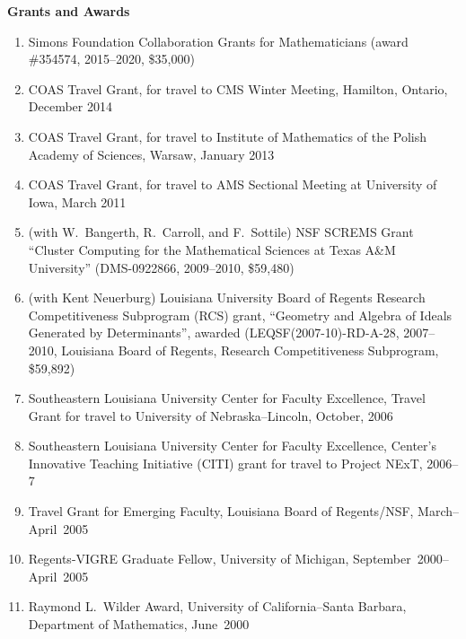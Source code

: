 \documentclass[12pt]{article}
\begin{document}
\textbf{Grants and Awards}
\begin{enumerate}
\item Simons Foundation Collaboration Grants for Mathematicians (award \#354574, 2015--2020, \$35,000)
\item COAS Travel Grant, for travel to CMS Winter Meeting, Hamilton, Ontario, December 2014
\item COAS Travel Grant, for travel to Institute of Mathematics of the Polish Academy of Sciences, Warsaw, January 2013
\item COAS Travel Grant, for travel to AMS Sectional Meeting at University of Iowa, March 2011
\item (with W.~Bangerth, R.~Carroll, and F.~Sottile)
NSF SCREMS Grant ``Cluster Computing for the 
Mathematical Sciences at Texas A\&M University''
(DMS-0922866, 2009--2010, \$59,480)
\item (with Kent Neuerburg)
Louisiana University Board of Regents Research Competitiveness Subprogram (RCS) grant,
``Geometry and Algebra of Ideals Generated by Determinants'',
awarded 
(LEQSF(2007-10)-RD-A-28, 2007--2010, Louisiana Board of Regents, Research Competitiveness Subprogram, \$59,892)
\item Southeastern Louisiana University Center for Faculty Excellence, Travel Grant for travel to University of Nebraska--Lincoln,
October, 2006
\item Southeastern Louisiana University Center for Faculty Excellence, Center's Innovative Teaching Initiative (CITI) grant
for travel to Project NExT, 2006--7
\item Travel Grant for Emerging Faculty, Louisiana Board of Regents/NSF, 
March--April~2005
\item Regents-VIGRE Graduate Fellow, University of Michigan, 
September~2000--April~2005
\item Raymond L.~Wilder Award, University of California--Santa Barbara,
Department of Mathematics, 
June~2000
\end{enumerate}
\end{document}
